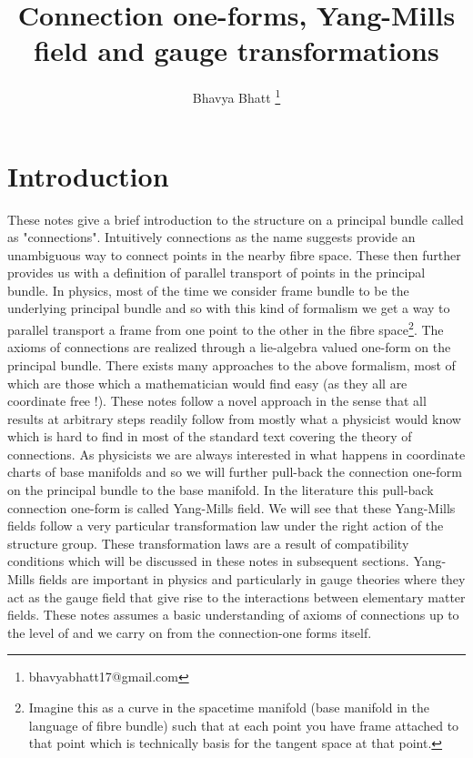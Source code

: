 \documentclass[12pt]{article}
\title{Connection one-forms, Yang-Mills field and gauge transformations}
\author[1]{Bhavya Bhatt \thanks{bhavyabhatt17@gmail.com}}
\affil[1]{Indian Institute of Technology Mandi, Mandi 175005, India}
\begin{document}
\maketitle
\section{Introduction}
These notes give a brief introduction to the structure on a principal bundle called as "connections". Intuitively connections as the name suggests provide an unambiguous way to connect points in the nearby fibre space. These then further provides us with a definition of parallel transport of points in the principal bundle. In physics, most of the time we consider frame bundle to be the underlying principal bundle and so with this kind of formalism we get a way to parallel transport a frame from one point to the other in the fibre space\footnote{Imagine this as a curve in the spacetime manifold (base manifold in the language of fibre bundle) such that at each point you have frame attached to that point which is technically basis for the tangent space at that point.}. The axioms of connections are realized through a lie-algebra valued one-form on the principal bundle. There exists many approaches to the above formalism, most of which are those which a mathematician would find easy (as they all are coordinate free !). These notes follow a novel approach in the sense that all results at arbitrary steps readily follow from mostly what a physicist would know which is hard to find in most of the standard text covering the theory of connections. As physicists we are always interested in what happens in coordinate charts of base manifolds and so we will further pull-back the connection one-form on the principal bundle to the base manifold. In the literature this pull-back connection one-form is called Yang-Mills field. We will see that these Yang-Mills fields follow a very particular transformation law under the right action of the structure group. These transformation laws are a result of compatibility conditions which will be discussed in these notes in subsequent sections. Yang-Mills fields are important in physics and particularly in gauge theories where they act as the gauge field that give rise to the interactions between elementary matter fields. These notes assumes a basic understanding of axioms of connections up to the level of \cite{nakahara_book} and we carry on from the connection-one forms itself.

\newpage
\end{document}
